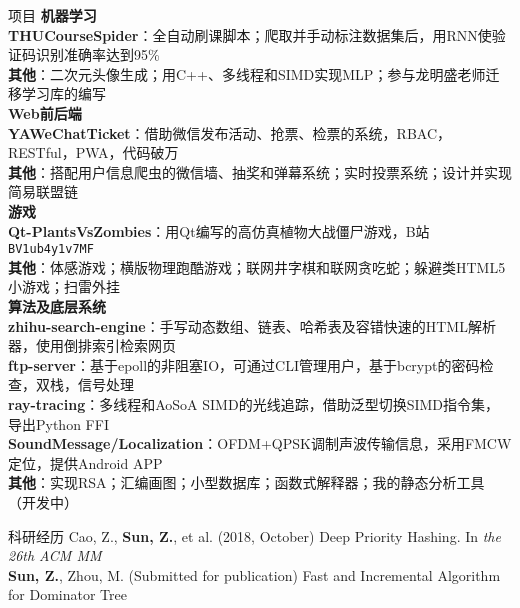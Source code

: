 \documentclass{resume}
\begin{document}
\begin{rSection}{项目}
\hspace*{-0.2in}\textbf{机器学习} \\
\textbf{THUCourseSpider}：全自动刷课脚本；爬取并手动标注数据集后，用RNN使验证码识别准确率达到95\% \\
\textbf{其他}：二次元头像生成；用C++、多线程和SIMD实现MLP；参与龙明盛老师迁移学习库的编写 \\
\hspace*{-0.2in}\textbf{Web前后端} \\
\textbf{YAWeChatTicket}：借助微信发布活动、抢票、检票的系统，RBAC，RESTful，PWA，代码破万 \\
\textbf{其他}：搭配用户信息爬虫的微信墙、抽奖和弹幕系统；实时投票系统；设计并实现简易联盟链 \\
\hspace*{-0.2in}\textbf{游戏} \\
\textbf{Qt-PlantsVsZombies}：用Qt编写的高仿真植物大战僵尸游戏，B站\texttt{BV1ub4y1v7MF} \\
\textbf{其他}：体感游戏；横版物理跑酷游戏；联网井字棋和联网贪吃蛇；躲避类HTML5小游戏；扫雷外挂 \\
\hspace*{-0.2in}\textbf{算法及底层系统} \\
\textbf{zhihu-search-engine}：手写动态数组、链表、哈希表及容错快速的HTML解析器，使用倒排索引检索网页 \\
\textbf{ftp-server}：基于epoll的非阻塞IO，可通过CLI管理用户，基于bcrypt的密码检查，双栈，信号处理 \\
\textbf{ray-tracing}：多线程和AoSoA SIMD的光线追踪，借助泛型切换SIMD指令集，导出Python FFI \\
\textbf{SoundMessage/Localization}：OFDM+QPSK调制声波传输信息，采用FMCW定位，提供Android APP \\
\textbf{其他}：实现RSA；汇编画图；小型数据库；函数式解释器；我的静态分析工具（开发中）
\end{rSection}

\begin{rSection}{科研经历}
Cao, Z., \textbf{Sun, Z.}, et al. (2018, October) Deep Priority Hashing. In \textit{the 26th ACM MM} \\
\textbf{Sun, Z.}, Zhou, M. (Submitted for publication) Fast and Incremental Algorithm for Dominator Tree
\end{rSection}
\end{document}
